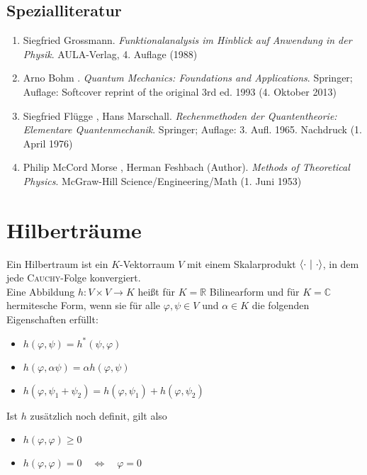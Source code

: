 \documentclass[a4paper,12pt,portrait]{book}
\numberwithin{equation}{section}
\begin{document}
\subsection{Spezialliteratur}
\begin{enumerate}
	\item Siegfried Grossmann. \textit{Funktionalanalysis im Hinblick auf Anwendung in der Physik}. AULA-Verlag, 4. Auflage (1988)
	\item Arno Bohm . \textit{Quantum Mechanics: Foundations and Applications}. Springer; Auflage: Softcover reprint of the original 3rd ed. 1993 (4. Oktober 2013)
	\item Siegfried Flügge , Hans Marschall. \textit{Rechenmethoden der Quantentheorie: Elementare Quantenmechanik}. Springer; Auflage: 3. Aufl. 1965. Nachdruck (1. April 1976)
	\item Philip McCord Morse , Herman Feshbach (Author). \textit{Methods of Theoretical Physics}. McGraw-Hill Science/Engineering/Math (1. Juni 1953)
\end{enumerate}



\section{Hilberträume}

Ein Hilbertraum ist ein $K$-Vektorraum $V$ mit einem Skalarprodukt $\left\langle \cdot \ \middle| \ \cdot\right\rangle$, in dem jede \textsc{Cauchy}-Folge konvergiert.\\

Eine Abbildung $h:V\times V\rightarrow K$ heißt für $K=\mathbb{R}$ Bilinearform und für $K=\mathbb{C}$ hermitesche Form, wenn sie für alle $\varphi, \psi\in V$ und $\alpha\in K$ die folgenden Eigenschaften erfüllt:
	
\begin{itemize}
	\item $h(\varphi, \psi) = h^*(\psi,\varphi)$
	\item $h(\varphi, \alpha\psi) = \alpha h (\varphi,\psi)$
	\item $h(\varphi, \psi_1 + \psi_2) = h(\varphi,\psi_1)+h(\varphi,\psi_2)$
\end{itemize}

Ist $h$ zusätzlich noch definit, gilt also

\begin{itemize}
	\item $h(\varphi,\varphi)\geq 0$
	\item $h(\varphi,\varphi) = 0 \quad \Leftrightarrow \quad \varphi = 0$
\end{itemize}
\end{document}
